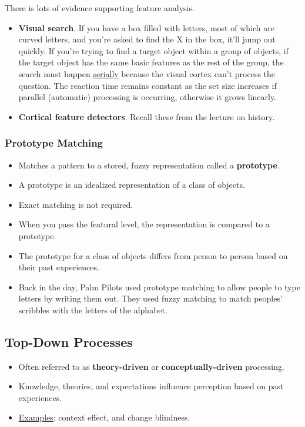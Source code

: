 \documentclass[]{article}
\begin{document}
				There is lots of evidence supporting feature analysis.
				\begin{itemize}
					\item \textbf{Visual search}. If you have a box filled with letters, most of which are curved letters, and you're asked to find the X in the box, it'll jump out quickly. If you're trying to find a target object within a group of objects, if the target object has the same basic features as the rest of the group, the search must happen \underline{serially} because the visual cortex can't process the question. The reaction time remains constant as the set size increases if parallel (automatic) processing is occurring, otherwise it grows linearly.
					\item \textbf{Cortical feature detectors}. Recall these from the lecture on history.
				\end{itemize}
			\subsubsection{Prototype Matching}
				\begin{itemize}
					\item Matches a pattern to a stored, fuzzy representation called a \textbf{prototype}.
					\item A prototype is an idealized representation of a class of objects.
					\item Exact matching is not required.
					\item When you pass the featural level, the representation is compared to a prototype.
					\item The prototype for a class of objects differs from person to person based on their past experiences.
					\item Back in the day, Palm Pilots used prototype matching to allow people to type letters by writing them out. They used fuzzy matching to match peoples' scribbles with the letters of the alphabet.
				\end{itemize}
		\subsection{Top-Down Processes}
			\begin{itemize}
				\item Often referred to as \textbf{theory-driven} or \textbf{conceptually-driven} processing.
				\item Knowledge, theories, and expectations influence perception based on past experiences.
				\item \underline{Examples}: context effect, and change blindness.
			\end{itemize}
\end{document}
